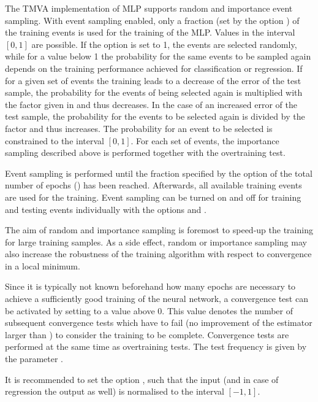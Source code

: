 The TMVA implementation of MLP supports random and importance event sampling. With 
event sampling enabled, only a fraction (set by the option ) 
of the training events is used for the training of the MLP. Values in the interval 
$[0,1]$ are possible. If the  option  is set to 1, the 
events are selected randomly, while for a value below 1 the probability for the same 
events to be sampled again depends on the training performance achieved for 
classification or regression. If for a given set of events the training leads to a 
decrease of the error of the test sample, the probability for the events of being 
selected again is multiplied with the factor given in  
and thus decreases. In the case of an increased error of the test sample, the 
probability for the events to be selected again is divided by the factor 
 and thus increases. The probability for an event to 
be selected is constrained to the interval $[0,1]$. For each set of events, 
the importance sampling described above is performed together with the overtraining 
test.

Event sampling is performed until the fraction specified by the option 
 of the total number of epochs () has been 
reached. Afterwards, all available training events are used for the training. 
Event sampling can be turned on and off for training and testing events 
individually with the options  and .

The aim of random and importance sampling is foremost to speed-up the training 
for large training samples. As a side effect, random or importance sampling may
also increase the robustness of the training algorithm with respect to convergence
in a local minimum.

Since it is typically not known beforehand how many epochs are necessary to 
achieve a sufficiently good training of the neural network, a convergence test 
can be activated by setting  to a value above 0. This 
value denotes the number of subsequent convergence tests which have to fail 
(\ie no improvement of the estimator larger than ) to 
consider the training to be complete. Convergence tests are performed at the 
same time as overtraining tests. The test frequency is given by the parameter 
.

It is recommended to set the option , such that 
the input (and in case of regression the output as well) is normalised to the 
interval $[-1,1]$.


